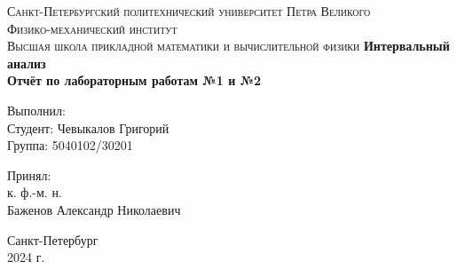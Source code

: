 \begin{titlepage}
    \begin{center}
        \textsc{
            Санкт-Петербургский политехнический университет Петра Великого\\[5mm]
            Физико-механический институт\\[2mm]
            Высшая школа прикладной математики и вычислительной физики
        }   
        \vfill
        \textbf{\large
            Интервальный анализ\\[5mm]
            Отчёт по лабораторным работам №1 и №2
        }                
    \end{center}

    \vfill
    \hfill
    \begin{minipage}{0.5\textwidth}
        Выполнил:\\[2mm]   
		Студент: Чевыкалов Григорий\\
		Группа: 5040102/30201\\
    \end{minipage}

    \hfill
    \begin{minipage}{0.5\textwidth}
        Принял:\\[2mm]
        к. ф.-м. н.\\   
        Баженов Александр Николаевич
    \end{minipage}

    \vfill
    \begin{center}
        Санкт-Петербург\\
        2024 г.
    \end{center}
\end{titlepage}